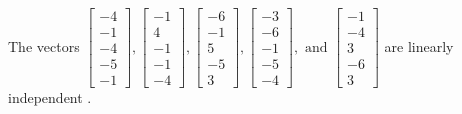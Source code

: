 \begin{exercise}
\begin{exerciseStatement}
  \end{exerciseStatement}
  \begin{exerciseAnswer}
   The vectors \(\left[\begin{array}{r}
-4 \\
-1 \\
-4 \\
-5 \\
-1
\end{array}\right] , \left[\begin{array}{r}
-1 \\
4 \\
-1 \\
-1 \\
-4
\end{array}\right] , \left[\begin{array}{r}
-6 \\
-1 \\
5 \\
-5 \\
3
\end{array}\right] , \left[\begin{array}{r}
-3 \\
-6 \\
-1 \\
-5 \\
-4
\end{array}\right] , \text{ and } \left[\begin{array}{r}
-1 \\
-4 \\
3 \\
-6 \\
3
\end{array}\right]\) are 
  	 linearly independent  .
  


  \end{exerciseAnswer}
\end{exercise}